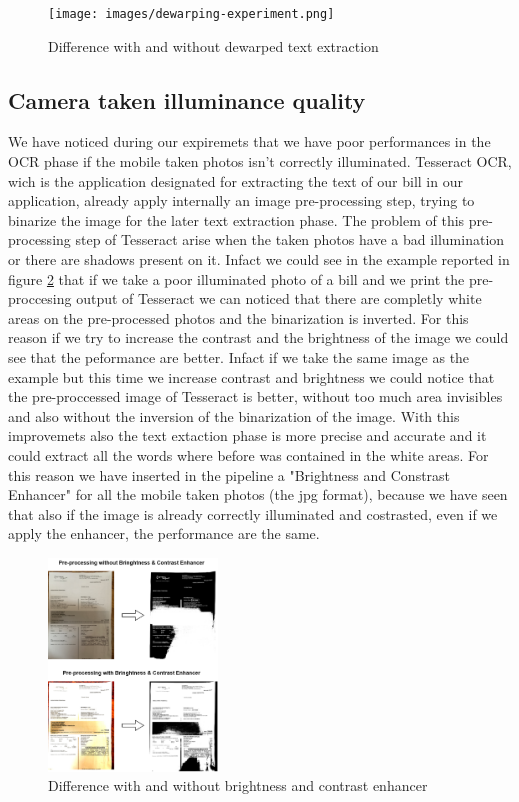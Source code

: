 \documentclass[10pt,twocolumn,letterpaper]{article}
\begin{document}
\begin{figure}[b]
	\centering
	\texttt{[image: images/dewarping-experiment.png]}
	\caption{Difference with and without dewarped text extraction}
	\label{dewarping-experiment}
\end{figure}


\subsection{Camera taken illuminance quality}
We have noticed during our expiremets that we have poor performances in the OCR phase if the mobile taken photos isn't correctly illuminated. Tesseract OCR, wich is the application designated for extracting the text of our bill in our application, already apply internally an image pre-processing step, trying to binarize the image for the later text extraction phase. The problem of this pre-processing step of Tesseract arise when the taken photos have a bad illumination or there are shadows present on it. Infact we could see in the example reported in figure \ref{bright-constrast-experiment} that if we take a poor illuminated photo of a bill and we print the pre-proccesing output of Tesseract we can noticed that there are completly white areas on the pre-processed photos and the binarization is inverted. For this reason if we try to increase the contrast and the brightness of the image we could see that the peformance are better. Infact if we take the same image as the example but this time we increase contrast and brightness we could notice that the pre-proccessed image of Tesseract is better, without too much area invisibles and also without the inversion of the binarization of the image. With this improvemets also the text extaction phase is more precise and accurate and it could extract all the words where before was contained in the white areas. For this reason we have inserted in the pipeline a "Brightness and Constrast Enhancer" for all the mobile taken photos (the jpg format), because we have seen that also if the image is already correctly illuminated and costrasted, even if we apply the enhancer, the performance are the same.

\begin{figure}[h]
	\centering
	\includegraphics[width=0.4\textwidth]{images/bright-contrast-experiment.png}
	\caption{Difference with and without brightness and contrast enhancer}
	\label{bright-constrast-experiment}
\end{figure}
\end{document}
